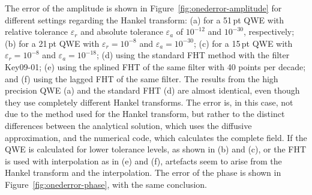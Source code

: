 \documentclass[manuscript,revised]{geophysics}
\begin{document}
The error of the amplitude is shown in Figure~\ref{fig:onederror-amplitude} for
different settings regarding the Hankel transform: (a) for a 51\,pt QWE with
relative tolerance $\varepsilon_r$ and absolute tolerance $\varepsilon_a$ of
$10^{-12}$ and $10^{-30}$, respectively; (b) for a 21\,pt QWE with
$\varepsilon_r = 10^{-8}$ and $\varepsilon_a = 10^{-30}$; (c) for a 15\,pt QWE
with $\varepsilon_r = 10^{-8}$ and $\varepsilon_a = 10^{-18}$; (d) using the
standard FHT method with the filter Key09-01; (e) using the
splined FHT of the same filter with 40 points per decade; and (f) using the
lagged FHT of the same filter.
%
%
The results from the high precision QWE (a) and the standard FHT (d) are almost
identical, even though they use completely different Hankel transforms.
The error is, in this case, not due to the method used for the Hankel transform,
but rather to the distinct differences between the
analytical solution, which uses the diffusive approximation, and the numerical
code, which calculates the complete field. If the QWE is calculated for lower
tolerance levels, as shown in (b) and (c), or the FHT is used with
interpolation as in (e) and (f), artefacts seem to arise from the Hankel
transform and the interpolation.  The error of the phase is shown in
Figure~\ref{fig:onederror-phase}, with the same conclusion.
%
%
\end{document}
